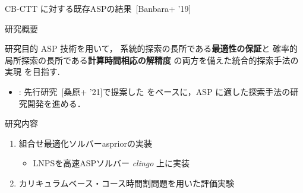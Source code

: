 \documentclass[11pt,dvipdfmx]{beamer}
\begin{document}
\begin{frame}{CB-CTT に対する既存ASPの結果~[Banbara+ '19]}
  \centering
  \tiny
  \begin{tableC}
    
  \end{tableC}
\end{frame}
\begin{frame}{研究概要}
  \begin{alertblock}{研究目的}\centering
    ASP 技術を用いて，
   系統的探索の長所である\alert{\bf 最適性の保証}と
   確率的局所探索の長所である\alert{\bf 計算時間相応の解精度}
   の両方を備えた統合的探索手法の実現
   を目指す.
  \end{alertblock}

  \begin{itemize}
  \item {}:
    先行研究~[桑原+ '21]で提案した%
    をベースに，ASP に適した探索手法の研究開発を進める．
  \end{itemize}

  \begin{block}{研究内容}
    \begin{enumerate}
    \item 組合せ最適化ソルバーaspriorの実装
     \begin{itemize}
      \item LNPSを高速ASPソルバー \textit{clingo} 上に実装
     \end{itemize}
    \item カリキュラムベース・コース時間割問題を用いた評価実験
    \end{enumerate}
  \end{block}
\end{frame}
\end{document}
